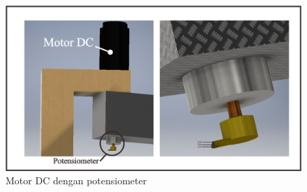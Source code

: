 \begin{figure}[H]
	\centering
	\includegraphics[width=12cm]{gambar/potsementara.jpg}
	\caption{Motor DC dengan potensiometer}
	\label{pic.potensiometer}
\end{figure}

